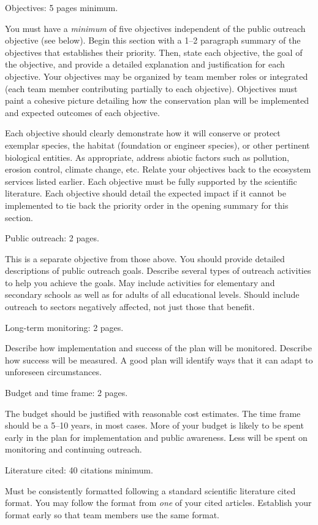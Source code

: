 \documentclass[12pt, hidelinks]{exam}
\begin{document}
\begin{questions}
	\question[50]
	Objectives: 5 pages minimum.
	
	You must have a \emph{minimum} of five objectives independent of the public outreach objective (see below). Begin this section with a 1--2 paragraph summary of the objectives that establishes their priority. Then, state each objective, the  goal of the objective, and provide a detailed explanation and justification for each objective. Your objectives may be organized by team member roles or integrated (each team member contributing partially to each objective). Objectives must paint a cohesive picture detailing how the conservation plan will be implemented and expected outcomes of each objective.
	
	Each objective should clearly demonstrate how it will conserve or protect exemplar species, the habitat (foundation or engineer species), or other pertinent biological entities. As appropriate, address abiotic factors such as pollution, erosion control, climate change, etc. Relate your objectives back to the ecosystem services listed earlier. Each objective must be fully supported by the scientific literature. Each objective should detail the expected impact if it cannot be implemented to tie back the priority order in the opening summary for this section.
	
	
	\question[20]
	Public outreach: 2 pages.
	
	This is a separate objective from those above. You should provide detailed descriptions of public outreach goals. Describe several types of outreach activities to help you achieve the goals. May include activities for elementary and secondary schools as well as for adults of all educational levels. Should include outreach to sectors negatively affected, not just those that benefit. 
	
	\question[20]
	Long-term monitoring: 2 pages.
	
	Describe how implementation and success of the plan will be monitored. Describe how success will be measured. A good plan will identify ways that it can adapt to unforeseen circumstances.
	
	\question[10]
	Budget and time frame: 2 pages.
	
	The budget should be justified with reasonable cost estimates. The time frame should be a 5–10 years, in most cases. More of your budget is likely to be spent early in the plan for implementation and public awareness. Less will be spent on monitoring and continuing outreach.
	
	\question[10]
	Literature cited: 40 citations minimum.
	
	Must be consistently formatted following a standard scientific literature cited format. You may follow the format from \emph{one} of your cited articles. Establish your format early so that team members use the same format. 
	
\end{questions}
\end{document}
